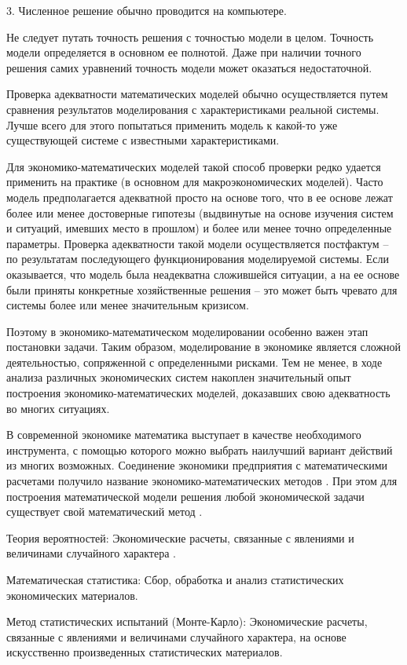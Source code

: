 3. Численное решение обычно проводится на компьютере. 


Не следует путать точность решения с точностью модели в целом. Точность модели определяется в основном ее полнотой. Даже при наличии точного решения самих уравнений точность модели может оказаться недостаточной.


Проверка адекватности математических моделей обычно осуществляется путем сравнения результатов моделирования с характеристиками реальной системы. Лучше всего для этого попытаться применить модель к какой-то уже существующей системе с известными характеристиками.


Для экономико-математических моделей такой способ проверки редко удается применить на практике (в основном для макроэкономических моделей). Часто модель предполагается адекватной просто на основе того, что в ее основе лежат более или менее достоверные гипотезы (выдвинутые на основе изучения систем и ситуаций, имевших место в прошлом) и более или менее точно определенные параметры. Проверка адекватности такой модели осуществляется постфактум – по результатам последующего функционирования моделируемой системы. Если оказывается, что модель была неадекватна сложившейся ситуации, а на ее основе были приняты конкретные хозяйственные решения – это может быть чревато для системы более или менее значительным кризисом.


Поэтому в экономико-математическом моделировании особенно важен этап постановки задачи. Таким образом, моделирование в экономике является сложной деятельностью, сопряженной с определенными рисками. Тем не менее, в ходе анализа различных экономических систем накоплен значительный опыт построения экономико-математических моделей, доказавших свою адекватность во многих ситуациях.


В современной экономике математика выступает в качестве необходимого инструмента, с помощью которого можно выбрать наилучший вариант действий из многих возможных. Соединение экономики предприятия с математическими расчетами получило название экономико-математических методов . При этом для построения математической модели решения любой экономической задачи существует свой математический метод .


Теория вероятностей: Экономические расчеты, связанные с явлениями и величинами случайного характера .


Математическая статистика: Сбор, обработка и анализ статистических экономических материалов.


Метод статистических испытаний (Монте-Карло): Экономические расчеты, связанные с явлениями и величинами случайного характера, на основе искусственно произведенных статистических материалов.


